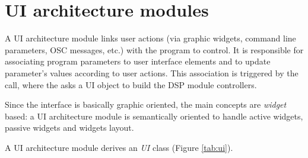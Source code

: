 \section{UI architecture modules} \label{sec:gui}

A UI architecture module links user actions (via graphic widgets, command line parameters, OSC messages, etc.) with the \faust program to control. 
It is responsible for associating program parameters to user interface elements and to update parameter's values according to user actions. This association is triggered by the  call, where the  asks a UI object to build the DSP module controllers.

Since the interface is basically graphic oriented, the main concepts are \emph{widget} based: a UI architecture module is semantically oriented to handle active widgets, passive widgets and widgets layout.

A \faust UI architecture module derives an \emph{UI} class (Figure \ref{tab:ui}). 

